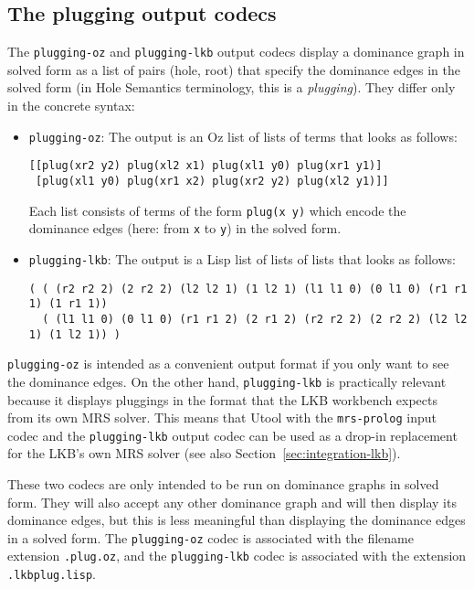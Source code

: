\subsection{The plugging output codecs}

The \verb?plugging-oz? and \verb?plugging-lkb? output codecs display a
dominance graph in solved form as a list of pairs (hole, root) that
specify the dominance edges in the solved form (in Hole Semantics
terminology, this is a \emph{plugging}). They differ only in the
concrete syntax:

\begin{itemize}
\item \verb?plugging-oz?: The output is an Oz list of lists of terms
  that looks as follows:
\begin{verbatim}
[[plug(xr2 y2) plug(xl2 x1) plug(xl1 y0) plug(xr1 y1)]
 [plug(xl1 y0) plug(xr1 x2) plug(xr2 y2) plug(xl2 y1)]]
\end{verbatim}
Each list consists of terms of the form \verb?plug(x y)? which encode
the dominance edges (here: from \verb?x? to \verb?y?) in the solved
form.
\item \verb?plugging-lkb?: The output is a Lisp list of lists of lists
  that looks as follows:
\begin{verbatim}
( ( (r2 r2 2) (2 r2 2) (l2 l2 1) (1 l2 1) (l1 l1 0) (0 l1 0) (r1 r1 1) (1 r1 1))
  ( (l1 l1 0) (0 l1 0) (r1 r1 2) (2 r1 2) (r2 r2 2) (2 r2 2) (l2 l2 1) (1 l2 1)) )
\end{verbatim}


\end{itemize}

\verb?plugging-oz? is intended as a convenient output format if you
only want to see the dominance edges. On the other hand,
\verb?plugging-lkb? is practically relevant because it displays
pluggings in the format that the LKB workbench expects from its own
MRS solver. This means that Utool with the \verb?mrs-prolog? input
codec and the \verb?plugging-lkb? output codec can be used as a
drop-in replacement for the LKB's own MRS solver (see also
Section~\ref{sec:integration-lkb}).

These two codecs are only intended to be run on dominance graphs in
solved form. They will also accept any other dominance graph and will
then display its dominance edges, but this is less meaningful than
displaying the dominance edges in a solved form. The
\verb?plugging-oz? codec is associated with the filename extension
\verb?.plug.oz?, and the \verb?plugging-lkb? codec is associated with
the extension \verb?.lkbplug.lisp?.



